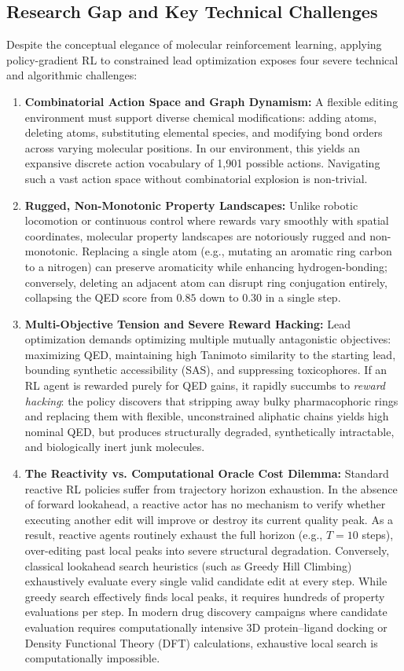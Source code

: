 \documentclass{ieeeaccess}
\begin{document}
\subsection{Research Gap and Key Technical Challenges}
Despite the conceptual elegance of molecular reinforcement learning, applying policy-gradient RL to constrained lead optimization exposes four severe technical and algorithmic challenges:
\begin{enumerate}
    \item \textbf{Combinatorial Action Space and Graph Dynamism:} A flexible editing environment must support diverse chemical modifications: adding atoms, deleting atoms, substituting elemental species, and modifying bond orders across varying molecular positions. In our environment, this yields an expansive discrete action vocabulary of 1,901 possible actions. Navigating such a vast action space without combinatorial explosion is non-trivial.
    \item \textbf{Rugged, Non-Monotonic Property Landscapes:} Unlike robotic locomotion or continuous control where rewards vary smoothly with spatial coordinates, molecular property landscapes are notoriously rugged and non-monotonic. Replacing a single atom (e.g., mutating an aromatic ring carbon to a nitrogen) can preserve aromaticity while enhancing hydrogen-bonding; conversely, deleting an adjacent atom can disrupt ring conjugation entirely, collapsing the QED score from $0.85$ down to $0.30$ in a single step.
    \item \textbf{Multi-Objective Tension and Severe Reward Hacking:} Lead optimization demands optimizing multiple mutually antagonistic objectives: maximizing QED, maintaining high Tanimoto similarity to the starting lead, bounding synthetic accessibility (SAS), and suppressing toxicophores. If an RL agent is rewarded purely for QED gains, it rapidly succumbs to \emph{reward hacking}: the policy discovers that stripping away bulky pharmacophoric rings and replacing them with flexible, unconstrained aliphatic chains yields high nominal QED, but produces structurally degraded, synthetically intractable, and biologically inert junk molecules.
    \item \textbf{The Reactivity vs. Computational Oracle Cost Dilemma:} Standard reactive RL policies suffer from trajectory horizon exhaustion. In the absence of forward lookahead, a reactive actor has no mechanism to verify whether executing another edit will improve or destroy its current quality peak. As a result, reactive agents routinely exhaust the full horizon (e.g., $T=10$ steps), over-editing past local peaks into severe structural degradation. Conversely, classical lookahead search heuristics (such as Greedy Hill Climbing) exhaustively evaluate every single valid candidate edit at every step. While greedy search effectively finds local peaks, it requires hundreds of property evaluations per step. In modern drug discovery campaigns where candidate evaluation requires computationally intensive 3D protein--ligand docking or Density Functional Theory (DFT) calculations, exhaustive local search is computationally impossible.
\end{enumerate}
\end{document}
